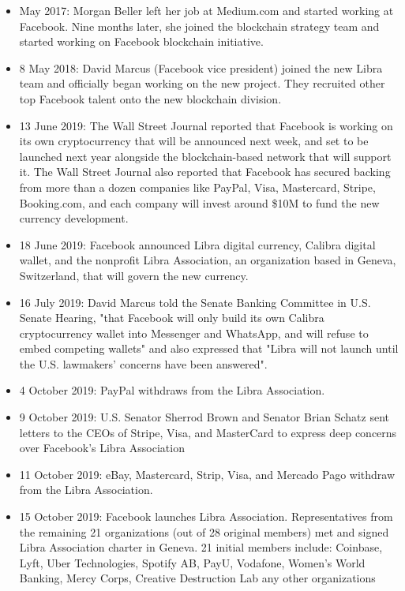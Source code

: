 \begin{itemize}
\item May 2017: Morgan Beller left her job at Medium.com and started working at Facebook. Nine months later, she joined the blockchain strategy team and started working on Facebook blockchain initiative.
\item 8 May 2018: David Marcus (Facebook vice president) joined the new Libra team and officially began working on the new project. They recruited other top Facebook talent onto the new blockchain division.
\item 13 June 2019: The Wall Street Journal reported that Facebook is working on its own cryptocurrency that will be announced next week, and set to be launched next year alongside the blockchain-based network that will support it. The Wall Street Journal also reported that Facebook has secured backing from more than a dozen companies like PayPal, Visa, Mastercard, Stripe, Booking.com, and each company will invest around \$10M to fund the new currency development.
\item 18 June 2019: Facebook announced Libra digital currency, Calibra digital wallet, and the nonprofit Libra Association, an organization based in Geneva, Switzerland, that will govern the new currency.
\item 16 July 2019: David Marcus told the Senate Banking Committee in U.S. Senate Hearing, "that Facebook will only build its own Calibra cryptocurrency wallet into Messenger and WhatsApp, and will refuse to embed competing wallets" and also expressed that "Libra will not launch until the U.S. lawmakers' concerns have been answered".
\item 4 October 2019: PayPal withdraws from the Libra Association.
\item 9 October 2019: U.S. Senator Sherrod Brown and Senator Brian Schatz sent letters to the CEOs of Stripe, Visa, and MasterCard to express deep concerns over Facebook's Libra Association
\item 11 October 2019: eBay, Mastercard, Strip, Visa, and Mercado Pago withdraw from the Libra Association.
\item 15 October 2019: Facebook launches Libra Association. Representatives from the remaining 21 organizations (out of 28 original members) met and signed Libra Association charter in Geneva. 21 initial members include: Coinbase, Lyft, Uber Technologies, Spotify AB, PayU, Vodafone, Women's World Banking, Mercy Corps, Creative Destruction Lab any other organizations
\end{itemize}

